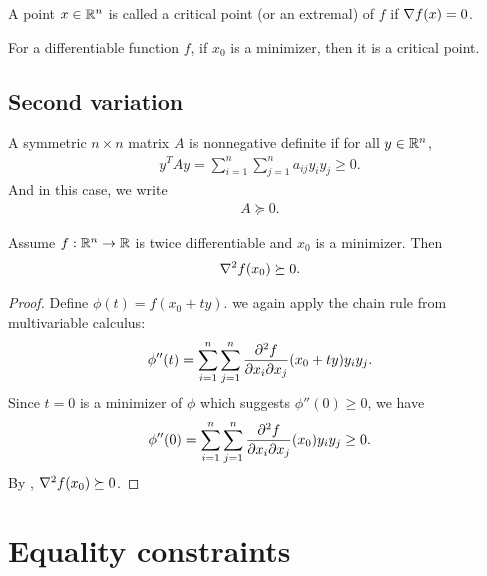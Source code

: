 \begin{definition}
A point $x \in \mathbb{R}^n$ is called a critical point (or an extremal) of $f$ if $\nabla f(x)=0$.
\end{definition}

\begin{remark}
For a differentiable function $f$, if $x_0$ is a minimizer, then it is a critical point.
\end{remark}

\subsection{Second variation}

\begin{definition}
A symmetric $n \times n$ matrix $A$ is nonnegative definite if for all $y \in \mathbb{R}^n$, 
\begin{align}
y^T A y = \sum_{i=1}^{n} \sum_{j=1}^{n} a_{ij}y_{i}y_{j} \ge 0.
\end{align}
And in this case, we write
\begin{align}
A \succeq 0.
\end{align}
\end{definition}

\begin{theorem}
Assume $f: \mathbb{R}^n \to \mathbb{R}$ is twice differentiable and $x_0$ is a minimizer.
Then
\begin{align}
\nabla^2 f(x_0) \succeq 0.
\end{align}
\end{theorem}

\begin{proof}
Define $\phi(t) = f(x_0 + ty)$.
we again apply the chain rule from multivariable calculus:
\begin{align}
\phi''(t) = \sum_{i=1}^{n}\sum_{j=1}^{n} \frac{\partial ^2 f}{\partial x_i \partial x_j} (x_0 + t y) y_i y_j.
\end{align}
Since $t = 0$ is a minimizer of $\phi$ which suggests $\phi''(0) \ge 0$, we have
\begin{align}
\phi''(0) = \sum_{i=1}^{n}\sum_{j=1}^{n} \frac{\partial ^2 f}{\partial x_i \partial x_j} (x_0) y_i y_j \ge 0.
\end{align}
By , $\nabla^2 f(x_0) \succeq 0$.
\end{proof}

\section{Equality constraints}

